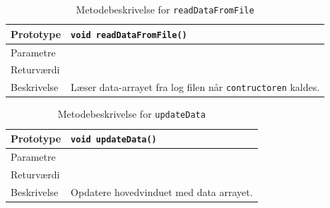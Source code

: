 \begin{table}[H]
\begin{tabularx}{\textwidth}{| L{2.5 cm} | Z |} \hline
Prototype & \texttt{void readDataFromFile()} \\\hline
Parametre &  \\\hline
Returværdi &  \\\hline
Beskrivelse & Læser data-arrayet fra log filen når \texttt{contructoren} kaldes.  \\\hline
\end{tabularx}
\caption{Metodebeskrivelse for \texttt{readDataFromFile}}
\label{table:met_readDataFromFile}
\end{table}

\begin{table}[H]
\begin{tabularx}{\textwidth}{| L{2.5 cm} | Z |} \hline
Prototype & \texttt{void updateData()} \\\hline
Parametre &  \\\hline
Returværdi &  \\\hline
Beskrivelse & Opdatere hovedvinduet med data arrayet. \\\hline
\end{tabularx}
\caption{Metodebeskrivelse for \texttt{updateData}}
\label{table:met_updateData}
\end{table}

\clearpage
